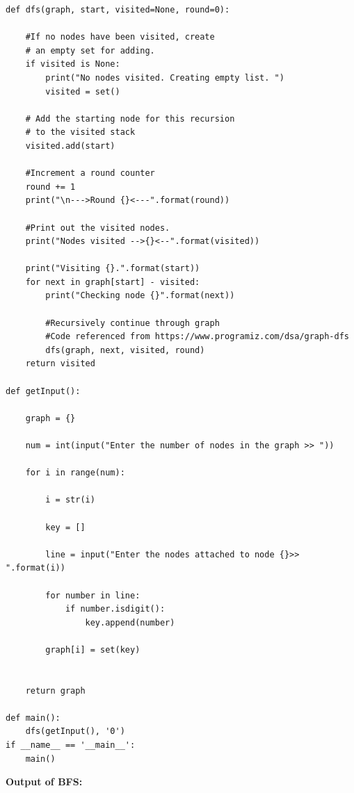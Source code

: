 \documentclass{article}
\begin{document}
\begin{lstlisting}
def dfs(graph, start, visited=None, round=0):

    #If no nodes have been visited, create 
    # an empty set for adding. 
    if visited is None:
        print("No nodes visited. Creating empty list. ")
        visited = set()

    # Add the starting node for this recursion
    # to the visited stack
    visited.add(start)

    #Increment a round counter
    round += 1
    print("\n--->Round {}<---".format(round))

    #Print out the visited nodes.
    print("Nodes visited -->{}<--".format(visited))

    print("Visiting {}.".format(start))
    for next in graph[start] - visited:
        print("Checking node {}".format(next))

        #Recursively continue through graph
        #Code referenced from https://www.programiz.com/dsa/graph-dfs
        dfs(graph, next, visited, round)
    return visited

def getInput():

    graph = {}

    num = int(input("Enter the number of nodes in the graph >> "))

    for i in range(num):

        i = str(i)

        key = []

        line = input("Enter the nodes attached to node {}>> ".format(i))

        for number in line:
            if number.isdigit():
                key.append(number)

        graph[i] = set(key)


    return graph

def main():
    dfs(getInput(), '0')
if __name__ == '__main__':
    main()
\end{lstlisting}

\textbf{Output of BFS:}
\end{document}
